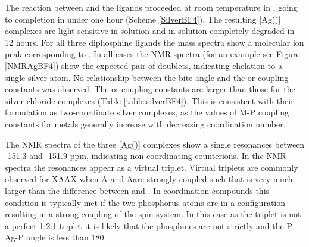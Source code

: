 The reaction between  and the \tBuxantphos{} ligands proceeded at room temperature in , going to completion in under one hour (Scheme \ref{SilverBF4}).  The resulting [Ag(\tBuxantphos)] complexes are light-sensitive in solution and in  solution completely degraded in 12 hours.  For all three diphosphine ligands the mass spectra show a molecular ion peak corresponding to \ce{[Ag(diphosphine)]+}. In all cases the \phosphorus{} NMR spectra (for an example see Figure \ref{NMRAgBF4}) show the expected pair of doublets, indicating chelation to a single silver atom.  No relationship between the bite-angle and the \JAgPseven{} or \JAgPnine{} coupling constants was observed.  The \JAgPseven{} or \JAgPnine{} coupling constants are larger than those for the silver chloride complexes (Table \ref{table:silverBF4}).  This is consistent with their formulation as two-coordinate silver complexes, as the values of M-P coupling constants for  metals generally increase with decreasing coordination number.\cite{Pregosin2012}

The \fluorine{} NMR spectra of the three [Ag(\tBuxantphos)] complexes show a single resonances between -151.3 and -151.9 ppm, indicating non-coordinating  counterions.  In the \proton{} NMR spectra the \tBu{} resonances appear as a virtual triplet.  Virtual triplets are commonly observed for XAA\textprime{}X\textprime{} when A and A\textprime are strongly coupled such that  is very much larger than the difference between  and .\cite{Harris1964}  In coordination compounds this condition is typically met if the two phosphorus atoms are in a \trans{} configuration resulting in a strong coupling of the spin system.\cite{Pregosin2012}  In this case as the triplet is not a perfect 1:2:1 triplet it is likely that the phosphines are not strictly \trans{} and the P-Ag-P angle is less than 180\degrees{}.  


